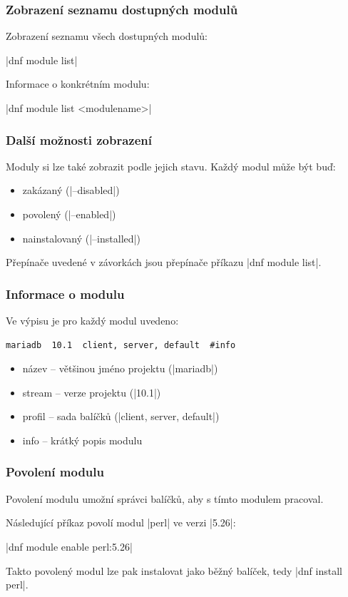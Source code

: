 \documentclass[12pt]{beamer}
\begin{document}
\begin{frame}[fragile]
\frametitle{Zobrazení seznamu dostupných modulů}

Zobrazení seznamu všech dostupných modulů:

\begin{center}
	\tc|dnf module list|
\end{center}

Informace o konkrétním modulu:

\begin{center}
	\tc|dnf module list <modulename>|
\end{center}
\end{frame}

\begin{frame}[fragile]
\frametitle{Další možnosti zobrazení}

Moduly si lze také zobrazit podle jejich stavu. Každý modul může být buď:

\begin{itemize}
	\item zakázaný (\tc|--disabled|)
	\item povolený (\tc|--enabled|)
	\item nainstalovaný (\tc|--installed|)
\end{itemize}

Přepínače uvedené v závorkách jsou přepínače příkazu \tc|dnf module list|.
\end{frame}

\begin{frame}[fragile]
\frametitle{Informace o modulu}
Ve výpisu je pro každý modul uvedeno:

\begin{verbatim}
mariadb  10.1  client, server, default  #info
\end{verbatim}

\begin{itemize}
	\item název -- většinou jméno projektu (\tc|mariadb|)
	\item stream -- verze projektu (\tc|10.1|)
	\item profil -- sada balíčků (\tc|client, server, default|)
	\item info -- krátký popis modulu
\end{itemize}
\end{frame}

\begin{frame}[fragile]
\frametitle{Povolení modulu}
Povolení modulu umožní správci balíčků, aby s tímto modulem pracoval. 

Následující příkaz povolí modul \tc|perl| ve verzi \tc|5.26|:

\begin{center}
	\tc|dnf module enable perl:5.26|
\end{center}

Takto povolený modul lze pak instalovat jako běžný balíček, tedy \tc|dnf install perl|.
\end{frame}
\end{document}
